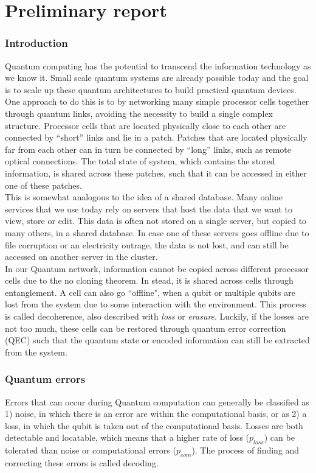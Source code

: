 \chapter{Preliminary report}

\subsection*{Introduction}

Quantum computing has the potential to transcend the information technology as we know it. Small scale quantum systems are already possible today and the goal is to scale up these quantum architectures to build practical quantum devices. One approach to do this is to by networking many simple processor cells together through quantum links, avoiding the necessity to build a single complex structure. Processor cells that are located physically close to each other are connected by ``short'' links and lie in a patch. Patches that are located physically far from each other can in turn be connected by ``long'' links, such as remote optical connections. The total state of system, which contains the stored information, is shared across these patches, such that it can be accessed in either one of these patches. \\

This is somewhat analogous to the idea of a shared database. Many online services that we use today rely on servers that host the data that we want to view, store or edit. This data is often not stored on a single server, but copied to many others, in a shared database. In case one of these servers goes offline due to file corruption or an electricity outrage, the data is not lost, and can still be accessed on another server in the cluster.\\

In our Quantum network, information cannot be copied across different processor cells due to the no cloning theorem. In stead, it is shared across cells through entanglement. A cell can also go ``offline", when a qubit or multiple qubits are lost from the system due to some interaction with the environment. This process is called decoherence, also described with \emph{loss} or \emph{erasure}. Luckily, if the losses are not too much, these cells can be restored through quantum error correction (QEC) such that the quantum state or encoded information can still be extracted from the system. \\

\subsection*{Quantum errors}
Errors that can occur during Quantum computation can generally be classified as 1) noise, in which there is an error are within the computational basis, or as 2) a loss, in which the qubit is
taken out of the computational basis. Losses are both detectable and locatable, which means that a higher rate of loss ($p_{loss}$) can be tolerated than noise or computational errors ($p_{com}$). The process of finding and correcting these errors is called decoding. \\

